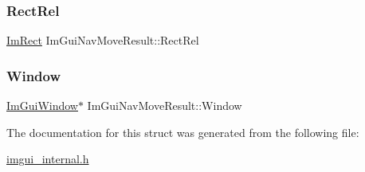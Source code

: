 \mbox{\label{struct_im_gui_nav_move_result_ae1be85fdcad1fc7c2bfa367862da2ccf}} 
\subsubsection{\texorpdfstring{Rect\+Rel}{RectRel}}
{\footnotesize\ttfamily \mbox{\hyperlink{struct_im_rect}{Im\+Rect}} Im\+Gui\+Nav\+Move\+Result\+::\+Rect\+Rel}

\mbox{\label{struct_im_gui_nav_move_result_a23b95c81d85a99990560c4072a135eb6}} 
\subsubsection{\texorpdfstring{Window}{Window}}
{\footnotesize\ttfamily \mbox{\hyperlink{struct_im_gui_window}{Im\+Gui\+Window}}$\ast$ Im\+Gui\+Nav\+Move\+Result\+::\+Window}



The documentation for this struct was generated from the following file\+:\begin{DoxyCompactItemize}
\item 
\mbox{\hyperlink{imgui__internal_8h}{imgui\+\_\+internal.\+h}}\end{DoxyCompactItemize}
